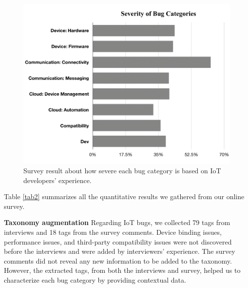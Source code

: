  \begin{figure}%
  \centering
   \includegraphics[width=\linewidth]{imgs/bugSev}
  \caption{Survey result about how severe each bug category is based on IoT developers' experience.}
  \label{fig:bugSev}
\end{figure}

 Table \ref{tab2} summarizes all the quantitative results we gathered from our online survey.

\textbf{Taxonomy augmentation}
Regarding IoT bugs, we collected 79 tags from interviews and 18 tags from the survey comments. Device binding issues, performance issues, and third-party compatibility issues were not discovered before the interviews and were added by interviewers' experience. The survey comments did not reveal any new information to be added to the taxonomy. However, the extracted tags, from both the interviews and survey, helped us to characterize each bug category by providing contextual data.

